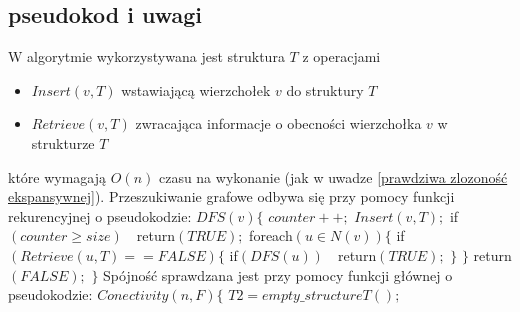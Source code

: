 \documentclass{pracamgr}
\begin{document}
   \subsection{pseudokod i uwagi}
    W algorytmie wykorzystywana jest struktura $T$ z operacjami
    \begin{itemize}
     \item $Insert(v,T)$ wstawiającą wierzchołek $v$ do struktury $T$
     \item $Retrieve(v,T)$ zwracająca informacje o obecności wierzchołka $v$ w strukturze $T$
    \end{itemize}
    które wymagają $O(n)$ czasu na wykonanie (jak w uwadze \ref{prawdziwa zlozoność ekspansywnej}).\newline
    Przeszukiwanie grafowe odbywa się przy pomocy funkcji rekurencyjnej o pseudokodzie:\newline
    \hspace*{0pt}$DFS(v)\{$\newline
    \hspace*{16pt}	$counter++;$\newline
    \hspace*{16pt}	$Insert(v,T);$\newline
    \hspace*{16pt}	if$(counter\ge size)\quad $return$(TRUE);$\newline
    \hspace*{16pt}	foreach$(u\in N(v))\{$\newline
    \hspace*{32pt}		if$(Retrieve(u,T)==FALSE)\{$\newline
    \hspace*{48pt}			if$(DFS(u))\quad $return$(TRUE);$\newline
    \hspace*{32pt}		$\}$\newline
    \hspace*{16pt}	$\}$\newline
    \hspace*{16pt}	return$(FALSE);$\newline
    \hspace*{0pt}$\}$\newline  
    Spójność sprawdzana jest przy pomocy funkcji głównej o pseudokodzie:\newline\newline
    \hspace*{0pt}$Conectivity(n,F)\{$\newline
    \hspace*{16pt}	$T2=empty\_structureT();$\newline
\end{document}
